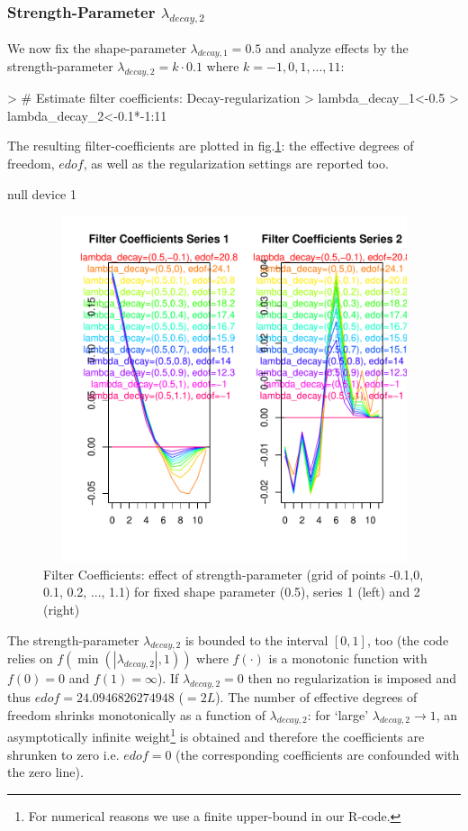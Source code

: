 \documentclass[a4paper]{book}
\begin{document}
\subsubsection{Strength-Parameter $\lambda_{decay,2}$}


We now fix the shape-parameter $\lambda_{decay,1}=0.5$ and analyze effects by the strength-parameter $\lambda_{decay,2}=k\cdot 0.1$ where $k=-1,0,1,...,11$:
\begin{Schunk}
\begin{Sinput}
> # Estimate filter coefficients: Decay-regularization
> lambda_decay_1<-0.5
> lambda_decay_2<-0.1*-1:11
\end{Sinput}
\end{Schunk}
The resulting filter-coefficients  are plotted in fig.\ref{z_mdfa_ms_reg_decay_screen_decay_2}: the effective degrees of freedom, $edof$, as well as the regularization settings are reported too.
\begin{Schunk}
\begin{Soutput}
null device 
          1 
\end{Soutput}
\end{Schunk}
\begin{figure}[H]\begin{center}\includegraphics[height=4in, width=6in]{z_mdfa_ms_reg_decay_screen_decay_2}\caption{Filter Coefficients: effect of strength-parameter (grid of points -0.1,0, 0.1, 0.2, ..., 1.1) for fixed shape parameter (0.5), series 1 (left) and 2 (right)\label{z_mdfa_ms_reg_decay_screen_decay_2}}\end{center}\end{figure}The strength-parameter $\lambda_{decay,2}$ is bounded to the interval $[0,1]$, too (the code relies on $f(\min(|\lambda_{decay,2}|,1))$ where $f(\cdot)$ is a monotonic function with $f(0)=0$ and $f(1)=\infty$). If $\lambda_{decay,2}=0$ then no regularization is imposed and thus $edof=24.0946826274948$ ($=2L$). The number of effective degrees of freedom shrinks monotonically as a function of $\lambda_{decay,2}$: for `large' $\lambda_{decay,2}\to 1$, an asymptotically infinite weight\footnote{For numerical reasons we use a finite upper-bound in our R-code.} is obtained and therefore the coefficients are shrunken to zero i.e. $edof=0$ (the corresponding coefficients are confounded with the zero line).
\end{document}
